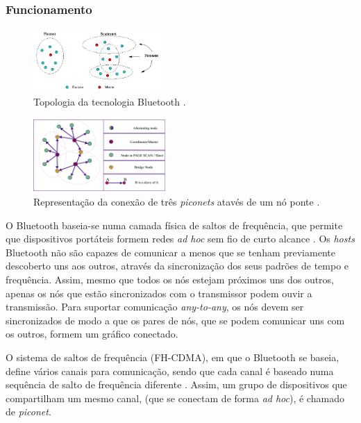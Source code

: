 \documentclass[conference]{IEEEtran}
\begin{document}
\subsubsection{Funcionamento}

\begin{figure}[!t]
  \centering
  \includegraphics[width=0.45\textwidth]{Esquema_Bluetooth.png}
  \caption{Topologia da tecnologia Bluetooth \cite{blueesptec}.}
  \label{fig:topBluet}
\end{figure}

\begin{figure}[!t]
  \centering
  \includegraphics[width=0.45\textwidth]{no_ponte.png}
  \caption{Representação da conexão de três \textit{piconets} atavés de um nó ponte \cite{salonidis2005distributed}.}
  \label{fig:noPonte}
\end{figure}

O Bluetooth baseia-se numa camada física de saltos de frequência, que permite que dispositivos portáteis formem redes \textit{ad hoc} sem fio de curto alcance \cite{salonidis2005distributed}. 
Os \textit{hosts} Bluetooth não são capazes de comunicar a menos que se tenham previamente descoberto uns aos outros, através da sincronização dos seus padrões de tempo e frequência. 
Assim, mesmo que todos os nós estejam próximos uns dos outros, apenas os nós que estão sincronizados com o transmissor podem ouvir a transmissão.
Para suportar comunicação \textit{any-to-any}, os nós devem ser sincronizados de modo a que os pares de nós, que se podem comunicar uns com os outros, formem um gráfico conectado.

O sistema de saltos de frequência (FH-CDMA), em que o Bluetooth se baseia, define vários canais para comunicação, sendo que cada canal é baseado numa sequência de salto de frequência diferente \cite{salonidis2005distributed}. 
Assim, um grupo de dispositivos que compartilham um mesmo canal, (que se conectam de forma \textit{ad hoc}), é chamado de \textit{piconet}. 
\end{document}
